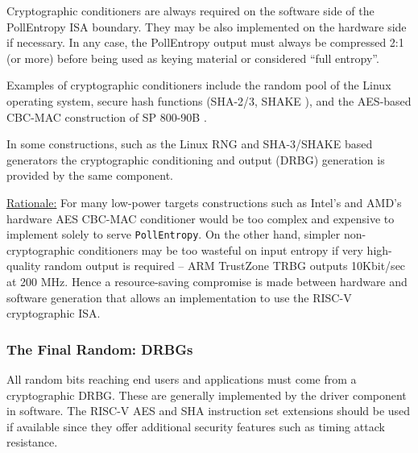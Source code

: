     Cryptographic conditioners are always required on the software side of
    the PollEntropy ISA boundary. They may be also implemented on the
    hardware side if necessary. In any case, the PollEntropy output must
    always be compressed 2:1 (or more) before being used as keying material
    or considered ``full entropy''.

    Examples of cryptographic conditioners include the random pool
    of the Linux operating system, secure hash functions (SHA-2/3,
    SHAKE \cite{NI15,NI15A} ),
    and the AES-based CBC-MAC construction of SP 800-90B \cite{TuBaKe+18}.

    In some constructions, such as the Linux RNG and SHA-3/SHAKE \cite{NI15}
    based generators the cryptographic conditioning and output (DRBG)
    generation is provided by the same component.

    \underline{Rationale:}
    For many low-power targets constructions such as Intel's
    \cite{Me18} and AMD's \cite{AM17} hardware AES CBC-MAC conditioner
    would be too complex and expensive to implement solely to serve
    \verb|PollEntropy|. On the other hand, simpler non-cryptographic
    conditioners may be too wasteful on input entropy if very high-quality
    random output is required -- ARM TrustZone TRBG \cite{AR17}
    outputs 10Kbit/sec at 200 MHz. Hence a resource-saving compromise is
    made between hardware and software generation that allows an
    implementation to use the RISC-V cryptographic ISA.


\subsubsection{The Final Random: DRBGs}
\label{sec:drbgs}

    All random bits reaching end users and applications must come from a
    cryptographic DRBG. These are generally implemented by the driver
    component in software. The RISC-V AES and SHA instruction set
    extensions should be used if available since they
    offer additional security features such as timing attack resistance.

